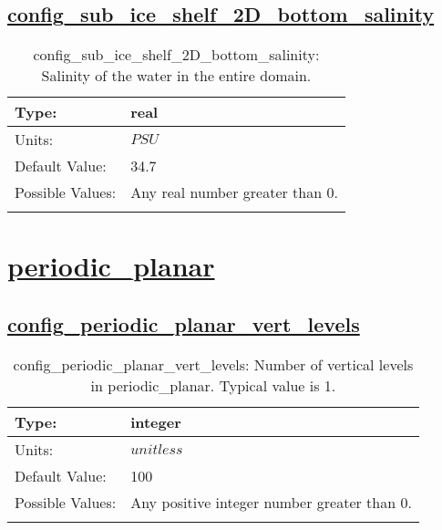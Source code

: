 \subsection[config\_sub\_ice\_shelf\_2D\_bottom\_salinity]{\hyperref[sec:nm_tab_sub_ice_shelf_2D]{config\_sub\_ice\_shelf\_2D\_bottom\_salinity}}
\label{subsec:nm_sec_config_sub_ice_shelf_2D_bottom_salinity}
\begin{center}
\begin{longtable}{| p{2.0in} || p{4.0in} |}
    \hline
    Type: & real \\
    \hline
    Units: & $PSU$ \\
    \hline
    Default Value: & 34.7 \\
    \hline
    Possible Values: & Any real number greater than 0. \\
    \hline
    \caption{config\_sub\_ice\_shelf\_2D\_bottom\_salinity: Salinity of the water in the entire domain.}
\end{longtable}
\end{center}
\section[periodic\_planar]{\hyperref[sec:nm_tab_periodic_planar]{periodic\_planar}}
\label{sec:nm_sec_periodic_planar}
\subsection[config\_periodic\_planar\_vert\_levels]{\hyperref[sec:nm_tab_periodic_planar]{config\_periodic\_planar\_vert\_levels}}
\label{subsec:nm_sec_config_periodic_planar_vert_levels}
\begin{center}
\begin{longtable}{| p{2.0in} || p{4.0in} |}
    \hline
    Type: & integer \\
    \hline
    Units: & $unitless$ \\
    \hline
    Default Value: & 100 \\
    \hline
    Possible Values: & Any positive integer number greater than 0. \\
    \hline
    \caption{config\_periodic\_planar\_vert\_levels: Number of vertical levels in periodic\_planar. Typical value is 1.}
\end{longtable}
\end{center}
